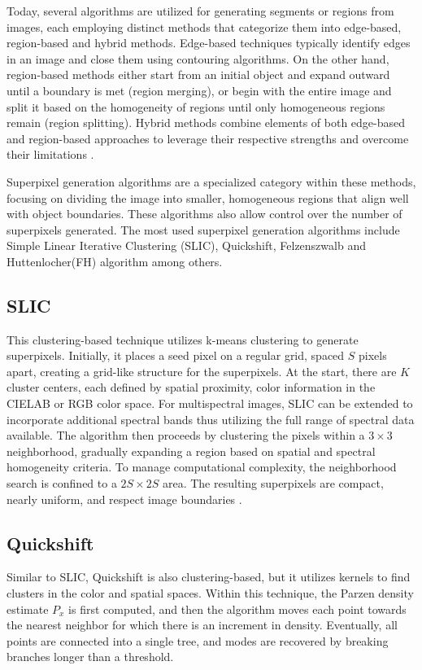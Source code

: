 Today, several algorithms are utilized for generating segments or regions from images, each employing distinct methods that categorize them into edge-based, region-based and hybrid methods. Edge-based techniques typically identify edges in an image and close them using contouring algorithms. On the other hand, region-based methods either start from an initial object and expand outward until a boundary is met (region merging), or begin with the entire image and split it based on the homogeneity of regions until only homogeneous regions remain (region splitting). Hybrid methods combine elements of both edge-based and region-based approaches to leverage their respective strengths and overcome their limitations \cite{hossain_segmentation_2019}.

Superpixel generation algorithms are a specialized category within these methods, focusing on dividing the image into smaller, homogeneous regions that align well with object boundaries. These algorithms also allow control over the number of superpixels generated\cite{stutz_superpixels_2018}. The most used superpixel generation algorithms include Simple Linear Iterative Clustering (SLIC), Quickshift, Felzenszwalb and Huttenlocher(FH) algorithm among others.

\subsection{SLIC}
This clustering-based technique utilizes k-means clustering to generate superpixels. Initially, it places a seed pixel on a regular grid, spaced $S$ pixels apart, creating a grid-like structure for the superpixels. At the start, there are $K$ cluster centers, each defined by spatial proximity, color information in the CIELAB or RGB color space. For multispectral images, SLIC can be extended to incorporate additional spectral bands thus utilizing the full range of spectral data available. The algorithm then proceeds by clustering the pixels within a $3 \times 3$ neighborhood, gradually expanding a region based on spatial and spectral homogeneity criteria. To manage computational complexity, the neighborhood search is confined to a $2S \times 2S$ area. The resulting superpixels are compact, nearly uniform, and respect image boundaries \cite{achanta_slic_2012}.


\subsection{Quickshift}
Similar to SLIC, Quickshift is also clustering-based, but it utilizes kernels to find clusters in the color and spatial spaces. Within this technique, the Parzen density estimate \( P_{x} \) is first computed, and then the algorithm moves each point towards the nearest neighbor for which there is an increment in density. Eventually, all points are connected into a single tree, and modes are recovered by breaking branches longer than a threshold.\cite{vedaldi_quick_2008}

